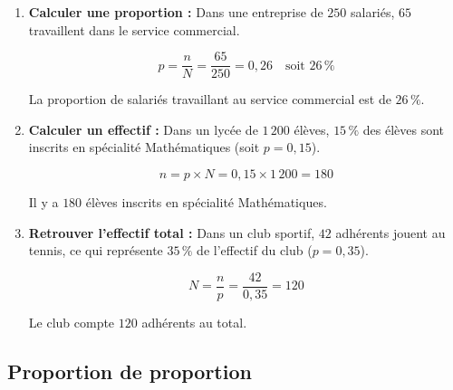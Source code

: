 \begin{ex}
	\nline
	\begin{enumerate}
		\item \textbf{Calculer une proportion :} Dans une entreprise de $250$ salariés, $65$ travaillent dans le service commercial.

		      \[
			      p = \dfrac{n}{N} = \dfrac{65}{250} = 0{,}26 \quad \text{soit } 26\,\%
		      \]

		      La proportion de salariés travaillant au service commercial est de $26\,\%$.

		\item \textbf{Calculer un effectif :} Dans un lycée de $1\,200$ élèves, $15\,\%$ des élèves sont inscrits en spécialité Mathématiques (soit $p = 0{,}15$).

		      \[
			      {n = p \times N = 0{,}15 \times 1\,200 = 180}
		      \]

		      Il y a $180$ élèves inscrits en spécialité Mathématiques.

		\item \textbf{Retrouver l'effectif total :} Dans un club sportif, $42$ adhérents jouent au tennis, ce qui représente $35\,\%$ de l'effectif du club ($p = 0{,}35$).

		      \[
			      N = \dfrac{n}{p} = \dfrac{42}{0{,}35} = 120
		      \]

		      Le club compte $120$ adhérents au total.
	\end{enumerate}
\end{ex}

\subsection{Proportion de proportion}

